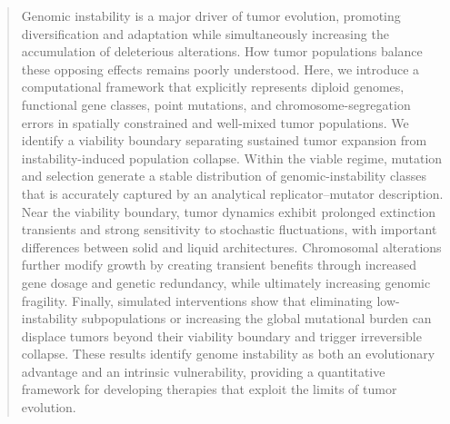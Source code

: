 \documentclass[10pt, aps, rmp,  twocolumn, superscriptaddress, floatfix, showkeys]{revtex4-2}
\begin{document}
\vspace{0.4 cm}
\begin{abstract}
\vspace{0.2 cm}  
Genomic instability is a major driver of tumor evolution, promoting diversification and adaptation while simultaneously increasing the accumulation of deleterious alterations. How tumor populations balance these opposing effects remains poorly understood. Here, we introduce a computational framework that explicitly represents diploid genomes, functional gene classes, point mutations, and chromosome-segregation errors in spatially constrained and well-mixed tumor populations. We identify a viability boundary separating sustained tumor expansion from instability-induced population collapse. Within the viable regime, mutation and selection generate a stable distribution of genomic-instability classes that is accurately captured by an analytical replicator--mutator description. Near the viability boundary, tumor dynamics exhibit prolonged extinction transients and strong sensitivity to stochastic fluctuations, with important differences between solid and liquid architectures. Chromosomal alterations further modify growth by creating transient benefits through increased gene dosage and genetic redundancy, while ultimately increasing genomic fragility. Finally, simulated interventions show that eliminating low-instability subpopulations or increasing the global mutational burden can displace tumors beyond their viability boundary and trigger irreversible collapse. These results identify genome instability as both an evolutionary advantage and an intrinsic vulnerability, providing a quantitative framework for developing therapies that exploit the limits of tumor evolution.

\end{abstract}
\end{document}
